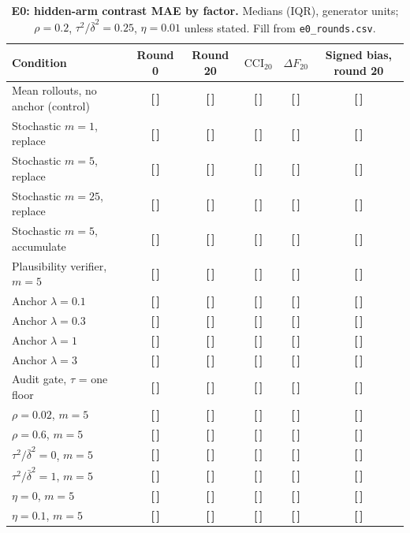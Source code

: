 \documentclass[11pt,a4paper]{article}
\newcommand{\T}{{\color{red}\textbf{[\,]}}}
\newcommand{\CCI}{\mathrm{CCI}}
\begin{document}
\begin{table}[!htbp]\centering\footnotesize
\caption{\textbf{E0: hidden-arm contrast MAE by factor.} Medians (IQR), generator units; $\rho=0.2$, $\tau^2/\bar\delta^2=0.25$, $\eta=0.01$ unless stated. Fill from \texttt{e0\_rounds.csv}.}
\begin{tabularx}{\textwidth}{@{}p{3.9cm} C C C C C@{}}\toprule
Condition & Round 0 & Round 20 & $\CCI_{20}$ & $\Delta F_{20}$ & Signed bias, round 20\\\midrule
Mean rollouts, no anchor (control) & \T & \T & \T & \T & \T\\
Stochastic $m=1$, replace & \T & \T & \T & \T & \T\\
Stochastic $m=5$, replace & \T & \T & \T & \T & \T\\
Stochastic $m=25$, replace & \T & \T & \T & \T & \T\\
Stochastic $m=5$, accumulate & \T & \T & \T & \T & \T\\
Plausibility verifier, $m=5$ & \T & \T & \T & \T & \T\\
Anchor $\lambda=0.1$ & \T & \T & \T & \T & \T\\
Anchor $\lambda=0.3$ & \T & \T & \T & \T & \T\\
Anchor $\lambda=1$ & \T & \T & \T & \T & \T\\
Anchor $\lambda=3$ & \T & \T & \T & \T & \T\\
Audit gate, $\tau$ = one floor & \T & \T & \T & \T & \T\\
$\rho=0.02$, $m=5$ & \T & \T & \T & \T & \T\\
$\rho=0.6$, $m=5$ & \T & \T & \T & \T & \T\\
$\tau^2/\bar\delta^2=0$, $m=5$ & \T & \T & \T & \T & \T\\
$\tau^2/\bar\delta^2=1$, $m=5$ & \T & \T & \T & \T & \T\\
$\eta=0$, $m=5$ & \T & \T & \T & \T & \T\\
$\eta=0.1$, $m=5$ & \T & \T & \T & \T & \T\\
\bottomrule\end{tabularx}
\end{table}
\FloatBarrier
\end{document}
